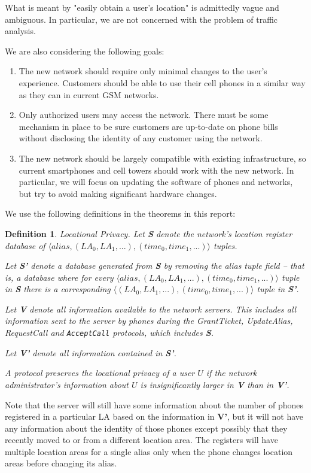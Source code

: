 \documentclass[11pt]{article}
\newtheorem{mydef}{Definition}
\begin{document}
What is meant by "easily obtain a user's location" is admittedly vague and ambiguous. In particular, we are not concerned with the problem of traffic analysis. 

We are also considering the following goals:
\begin{enumerate}
\item
The new network should require only minimal changes to the user's experience. Customers should be able to use their cell phones in a similar way as they can in current GSM networks.
\item
Only authorized users may access the network. There must be some mechanism in place to be sure customers are up-to-date on phone bills without disclosing the identity of any customer using the network.
\item
The new network should be largely compatible with existing infrastructure, so current smartphones and cell towers should work with the new network. In particular, we will focus on updating the software of phones and networks, but try to avoid making significant hardware changes.
\end{enumerate}

We use the following definitions in the theorems in this report:
\begin{mydef}Locational Privacy.
	Let \textbf{S} denote the network's location register database of $\langle alias, (LA_0, LA_1, ...), (time_0, time_1, ...) \rangle$ tuples.

	Let \textbf{S'} denote a database generated from \textbf{S} by removing the alias tuple field -- that is, a database where for every $\langle alias, (LA_0, LA_1, ...), (time_0, time_1, ...)\rangle$ tuple in \textbf{S} there is a corresponding $\langle(LA_0, LA_1, ...), (time_0, time_1, ...)\rangle$ tuple in \textbf{S'}.

	Let \textbf{V} denote all information available to the network servers. This includes all information sent to the server by phones during the \emph{GrantTicket, UpdateAlias, RequestCall} and \emph{\texttt{AcceptCall}} protocols, which includes \textbf{S}.

	Let \textbf{V'} denote all information contained in \textbf{S'}.

	A protocol preserves the \emph{locational privacy} of a user $U$ if the network administrator's information about $U$ is insignificantly larger in \textbf{V} than in \textbf{V'}.
\end{mydef}

Note that the server will still have some information about the number of phones registered in a particular LA based on the information in \textbf{V'}, but it will not have any information about the identity of those phones except possibly that they recently moved to or from a different location area. The registers will have multiple location areas for a single alias only when the phone changes location areas before changing its alias. 
\end{document}
